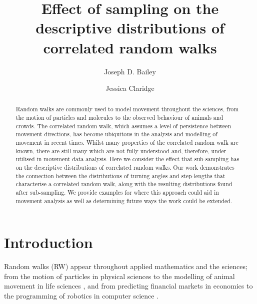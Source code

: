 \documentclass[english]{article}
\begin{document}
\title{Effect of sampling on the descriptive distributions of correlated random walks}
\author[1]{Joseph D. Bailey}
\author[1]{Jessica Claridge}

\maketitle

\begin{abstract}
Random walks are commonly used to model movement throughout the sciences, from the motion of particles and molecules to the observed behaviour of animals and crowds.  The correlated random walk, which assumes a level of persistence between movement directions, has become ubiquitous in the analysis and modelling of movement in recent times.  Whilst many properties of the correlated random walk are known, there are still many which are not fully understood and, therefore, under utilised in movement data analysis.  Here we consider the effect that sub-sampling has on the descriptive distributions of correlated random walks.  Our work demonstrates the connection between the distributions of turning angles and step-lengths that characterise a correlated random walk, along with the resulting distributions found after sub-sampling.  We provide examples for where this approach could aid in movement analysis as well as determining future ways the work could be extended.
\end{abstract}

\section{Introduction}
Random walks (RW) appear throughout applied mathematics and the sciences; from the motion of particles in physical sciences \citep{patlak1953random,alt1980biased} to the modelling of animal movement in life sciences \citep{berg1993random,codling2008random,bailey2018navigational}, and from predicting financial markets in economics \citep{fama1995random} to the programming of robotics in computer science \citep{dimidov2016random}.
\end{document}
